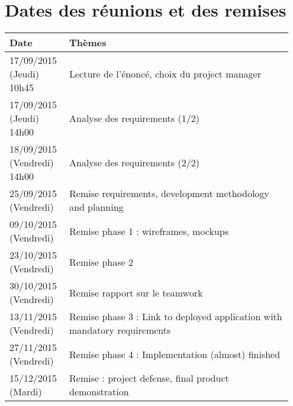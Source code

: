 \section{Dates des réunions et des remises}

\begin{tabular}{|p{0.2\linewidth}|p{0.75\linewidth}|}
    Date & Thèmes \\
    \hline
    \hline
    17/09/2015 (Jeudi) 10h45 & Lecture de l'énoncé, choix du project
    manager \\
    \hline
    17/09/2015 (Jeudi) 14h00 & Analyse des requirements (1/2) \\
    \hline
    18/09/2015 (Vendredi) 14h00 & Analyse des requirements (2/2) \\
    \hline
    25/09/2015 (Vendredi) & Remise requirements, development methodology
    and planning \\
    \hline
    09/10/2015 (Vendredi) & Remise phase 1 : wireframes, mockups \\
    \hline
    23/10/2015 (Vendredi) & Remise phase 2 \\
    \hline
    30/10/2015 (Vendredi) & Remise rapport sur le teamwork \\
    \hline
    13/11/2015 (Vendredi) & Remise phase 3 : Link to deployed
    application with mandatory requirements \\
    \hline
    27/11/2015 (Vendredi) & Remise phase 4 : Implementation (almost)
    finished \\
    \hline
    15/12/2015 (Mardi) & Remise : project defense, final product
    demonstration \\
    \hline
\end{tabular}
